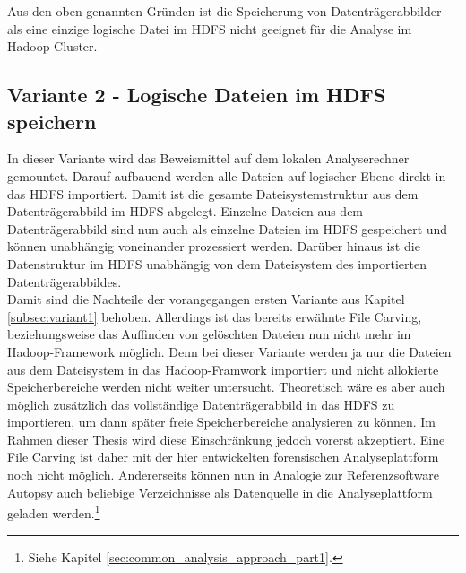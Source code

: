 \noindent
Aus den oben genannten Gründen ist die Speicherung von Datenträgerabbilder als eine einzige logische Datei im HDFS nicht geeignet für die Analyse im Hadoop-Cluster.

\subsection{Variante 2 - Logische Dateien im HDFS speichern}
In dieser Variante wird das Beweismittel auf dem lokalen Analyserechner gemountet. Darauf aufbauend werden alle Dateien auf logischer Ebene direkt in das HDFS importiert. Damit ist die gesamte Dateisystemstruktur aus dem Datenträgerabbild im HDFS abgelegt. Einzelne Dateien aus dem Datenträgerabbild sind nun auch als einzelne Dateien im HDFS gespeichert und können unabhängig voneinander prozessiert werden. Darüber hinaus ist die Datenstruktur im HDFS unabhängig von dem Dateisystem des importierten Datenträgerabbildes.\\
Damit sind die Nachteile der vorangegangen ersten Variante aus Kapitel \ref{subsec:variant1} behoben. Allerdings ist das bereits erwähnte File Carving, beziehungsweise das Auffinden von gelöschten Dateien nun nicht mehr im Hadoop-Framework möglich. Denn bei dieser Variante werden ja nur die Dateien aus dem Dateisystem in das Hadoop-Framwork importiert und nicht allokierte Speicherbereiche werden nicht weiter untersucht. Theoretisch wäre es aber auch möglich zusätzlich das vollständige Datenträgerabbild in das HDFS zu importieren, um dann später freie Speicherbereiche analysieren zu können. Im Rahmen dieser Thesis wird diese Einschränkung jedoch vorerst akzeptiert. Eine File Carving ist daher mit der hier entwickelten forensischen Analyseplattform noch nicht möglich. Andererseits können nun in Analogie zur Referenzsoftware Autopsy auch beliebige Verzeichnisse als Datenquelle in die Analyseplattform geladen werden.\footnote{Siehe Kapitel \ref{sec:common_analysis_approach_part1}.}\\ 


